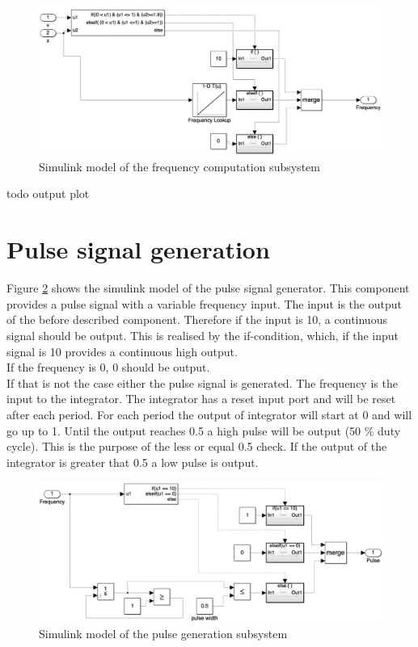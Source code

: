 \begin{figure}[H]
\centering
\includegraphics[width=1\textwidth]{images/D6_Frequency_Computation.png}
\caption{Simulink model of the frequency computation subsystem}
\label{fig:D6_Frequency_Computation}
\end{figure}

todo output plot
\section{Pulse signal generation}\label{sec:D6Signal}
Figure \ref{fig:D6_Pulse_Signal} shows the simulink model of the pulse signal generator.
This component provides a pulse signal with a variable frequency input.
The input is the output of the before described component.
Therefore if the input is 10, a continuous signal should be output.
This is realised by the if-condition, which, if the input signal is 10 provides a continuous high output.\\
If the frequency is 0, 0 should be output.\\
If that is not the case either the pulse signal is generated.
The frequency is the input to the integrator.
The integrator has a reset input port and will be reset after each period.
For each period the output of integrator will start at 0 and will go up to 1.
Until the output reaches 0.5 a high pulse will be output (50 \% duty cycle).
This is the purpose of the less or equal 0.5 check.
If the output of the integrator is greater that 0.5 a low pulse is output.

\begin{figure}[H]
\centering
\includegraphics[width=1\textwidth]{images/D6_provide_signal.png}
\caption{Simulink model of the pulse generation subsystem}
\label{fig:D6_Pulse_Signal}
\end{figure}

